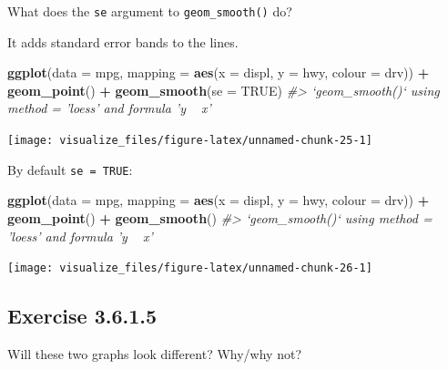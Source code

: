 \documentclass[]{book}
\newenvironment{Shaded}{\begin{snugshade}}{\end{snugshade}}
\newcommand{\CommentTok}[1]{\textcolor[rgb]{0.56,0.35,0.01}{\textit{#1}}}
\newcommand{\DataTypeTok}[1]{\textcolor[rgb]{0.13,0.29,0.53}{#1}}
\newcommand{\KeywordTok}[1]{\textcolor[rgb]{0.13,0.29,0.53}{\textbf{#1}}}
\newcommand{\NormalTok}[1]{#1}
\newcommand{\OperatorTok}[1]{\textcolor[rgb]{0.81,0.36,0.00}{\textbf{#1}}}
\newcommand{\OtherTok}[1]{\textcolor[rgb]{0.56,0.35,0.01}{#1}}
\newcommand{\StringTok}[1]{\textcolor[rgb]{0.31,0.60,0.02}{#1}}
\theoremstyle{plain}
\theoremstyle{remark}
\begin{document}
What does the \texttt{se} argument to \texttt{geom\_smooth()} do?

It adds standard error bands to the lines.

\begin{Shaded}
\begin{Highlighting}[]
\KeywordTok{ggplot}\NormalTok{(}\DataTypeTok{data =}\NormalTok{ mpg, }\DataTypeTok{mapping =} \KeywordTok{aes}\NormalTok{(}\DataTypeTok{x =}\NormalTok{ displ, }\DataTypeTok{y =}\NormalTok{ hwy, }\DataTypeTok{colour =}\NormalTok{ drv)) }\OperatorTok{+}
\StringTok{  }\KeywordTok{geom_point}\NormalTok{() }\OperatorTok{+}
\StringTok{  }\KeywordTok{geom_smooth}\NormalTok{(}\DataTypeTok{se =} \OtherTok{TRUE}\NormalTok{)}
\CommentTok{#> `geom_smooth()` using method = 'loess' and formula 'y ~ x'}
\end{Highlighting}
\end{Shaded}

\begin{center}\texttt{[image: visualize\_files/figure-latex/unnamed-chunk-25-1]} \end{center}

By default \texttt{se\ =\ TRUE}:

\begin{Shaded}
\begin{Highlighting}[]
\KeywordTok{ggplot}\NormalTok{(}\DataTypeTok{data =}\NormalTok{ mpg, }\DataTypeTok{mapping =} \KeywordTok{aes}\NormalTok{(}\DataTypeTok{x =}\NormalTok{ displ, }\DataTypeTok{y =}\NormalTok{ hwy, }\DataTypeTok{colour =}\NormalTok{ drv)) }\OperatorTok{+}
\StringTok{  }\KeywordTok{geom_point}\NormalTok{() }\OperatorTok{+}
\StringTok{  }\KeywordTok{geom_smooth}\NormalTok{()}
\CommentTok{#> `geom_smooth()` using method = 'loess' and formula 'y ~ x'}
\end{Highlighting}
\end{Shaded}

\begin{center}\texttt{[image: visualize\_files/figure-latex/unnamed-chunk-26-1]} \end{center}

\hypertarget{exercise-3.6.1.5}{%
\subsection*{\texorpdfstring{Exercise {3.6.1.5}}{Exercise 3.6.1.5}}\label{exercise-3.6.1.5}}

Will these two graphs look different? Why/why not?
\end{document}

